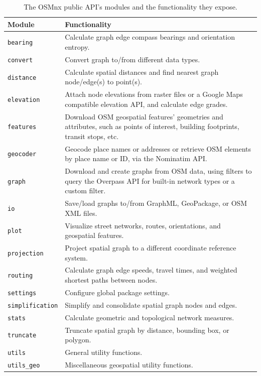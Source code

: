 \documentclass[12pt,letterpaper]{article} %
\begin{document}
\begin{table}[htbp]
    \centering
    \caption{The OSMnx public API's modules and the functionality they expose.}\label{tab:osmnx_modules}
    \begin{tabular}{lp{10cm}}
        \toprule
        Module &  Functionality \\
        \midrule
        \texttt{bearing}  & Calculate graph edge compass bearings and orientation entropy.\\
        \texttt{convert}  & Convert graph to/from different data types.\\
        \texttt{distance}  & Calculate spatial distances and find nearest graph node/edge(s) to point(s).\\
        \texttt{elevation}  &  Attach node elevations from raster files or a Google Maps compatible elevation API, and calculate edge grades.\\
        \texttt{features}  &  Download OSM geospatial features' geometries and attributes, such as points of interest, building footprints, transit stops, etc.\\
        \texttt{geocoder}  & Geocode place names or addresses or retrieve OSM elements by place name or ID, via the Nominatim API.\\
        \texttt{graph}  & Download and create graphs from OSM data, using filters to query the Overpass API for built-in network types or a custom filter.\\
        \texttt{io}  & Save/load graphs to/from GraphML, GeoPackage, or OSM XML files.\\
        \texttt{plot} & Visualize street networks, routes, orientations, and geospatial features.  \\
        \texttt{projection}  &  Project spatial graph to a different coordinate reference system.\\
        \texttt{routing}  &  Calculate graph edge speeds, travel times, and weighted shortest paths between nodes.\\
        \texttt{settings}  & Configure global package settings.\\
        \texttt{simplification}  & Simplify and consolidate spatial graph nodes and edges.\\
        \texttt{stats}  &  Calculate geometric and topological network measures.\\
        \texttt{truncate}  & Truncate spatial graph by distance, bounding box, or polygon.\\
        \texttt{utils}  & General utility functions.\\
        \texttt{utils\_geo}  & Miscellaneous geospatial utility functions.\\
        \bottomrule
    \end{tabular}
\end{table}
\end{document}
